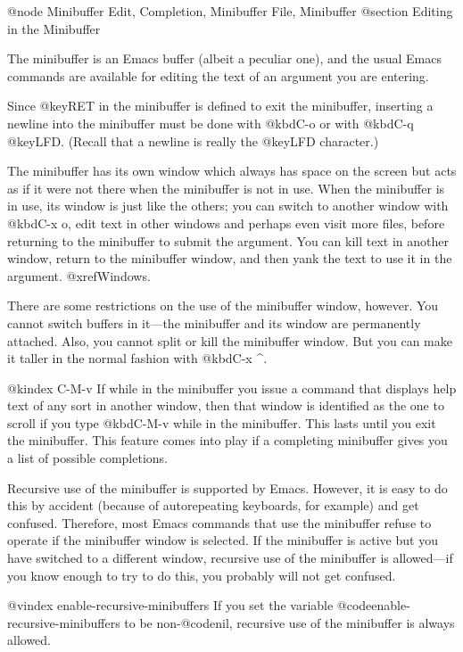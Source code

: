 {{{{{{@node Minibuffer Edit, Completion, Minibuffer File, Minibuffer
@section Editing in the Minibuffer

  The minibuffer is an Emacs buffer (albeit a peculiar one), and the usual
Emacs commands are available for editing the text of an argument you are
entering.

  Since @key{RET} in the minibuffer is defined to exit the minibuffer,
inserting a newline into the minibuffer must be done with @kbd{C-o} or with
@kbd{C-q @key{LFD}}.  (Recall that a newline is really the @key{LFD}
character.)

  The minibuffer has its own window which always has space on the screen
but acts as if it were not there when the minibuffer is not in use.  When
the minibuffer is in use, its window is just like the others; you can
switch to another window with @kbd{C-x o}, edit text in other windows and
perhaps even visit more files, before returning to the minibuffer to submit
the argument.  You can kill text in another window, return to the
minibuffer window, and then yank the text to use it in the argument.
@xref{Windows}.

  There are some restrictions on the use of the minibuffer window, however.
You cannot switch buffers in it---the minibuffer and its window are
permanently attached.  Also, you cannot split or kill the minibuffer
window.  But you can make it taller in the normal fashion with @kbd{C-x ^}.

@kindex C-M-v
  If while in the minibuffer you issue a command that displays help text
of any sort in another window, then that window is identified as the
one to scroll if you type @kbd{C-M-v} while in the minibuffer.  This
lasts until you exit the minibuffer.  This feature comes into play
if a completing minibuffer gives you a list of possible completions.

  Recursive use of the minibuffer is supported by Emacs.  However, it is
easy to do this by accident (because of autorepeating keyboards, for
example) and get confused.  Therefore, most Emacs commands that use the
minibuffer refuse to operate if the minibuffer window is selected.  If the
minibuffer is active but you have switched to a different window, recursive
use of the minibuffer is allowed---if you know enough to try to do this,
you probably will not get confused.

@vindex enable-recursive-minibuffers
  If you set the variable @code{enable-recursive-minibuffers} to be
non-@code{nil}, recursive use of the minibuffer is always allowed.

}}}}}}
